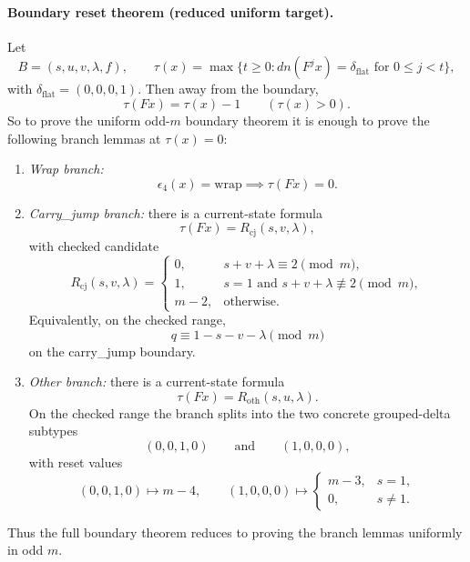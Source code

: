 
\paragraph{Boundary reset theorem (reduced uniform target).}
Let
\[
B=(s,u,v,\lambda,f),\qquad \tau(x)=\max\{t\ge 0: dn(F^j x)=\delta_{\mathrm{flat}}\text{ for }0\le j<t\},
\]
with \(\delta_{\mathrm{flat}}=(0,0,0,1)\). Then away from the boundary,
\[
\tau(Fx)=\tau(x)-1\qquad (\tau(x)>0).
\]
So to prove the uniform odd-\(m\) boundary theorem it is enough to prove the following branch lemmas at \(\tau(x)=0\):
\begin{enumerate}
\item \emph{Wrap branch:}
\[
\epsilon_4(x)=\mathrm{wrap}\implies \tau(Fx)=0.
\]
\item \emph{Carry\_jump branch:} there is a current-state formula
\[
\tau(Fx)=R_{\mathrm{cj}}(s,v,\lambda),
\]
with checked candidate
\[
R_{\mathrm{cj}}(s,v,\lambda)=
\begin{cases}
0,& s+v+\lambda\equiv 2\pmod m,\\
1,& s=1 \text{ and } s+v+\lambda\not\equiv 2\pmod m,\\
m-2,& \text{otherwise}.
\end{cases}
\]
Equivalently, on the checked range,
\[
q\equiv 1-s-v-\lambda\pmod m
\]
on the carry\_jump boundary.
\item \emph{Other branch:} there is a current-state formula
\[
\tau(Fx)=R_{\mathrm{oth}}(s,u,\lambda).
\]
On the checked range the branch splits into the two concrete grouped-delta subtypes
\[
(0,0,1,0)\qquad\text{and}\qquad(1,0,0,0),
\]
with reset values
\[
(0,0,1,0)\mapsto m-4,
\qquad
(1,0,0,0)\mapsto
\begin{cases}
m-3,& s=1,\\
0,& s\neq 1.
\end{cases}
\]
\end{enumerate}
Thus the full boundary theorem reduces to proving the branch lemmas uniformly in odd \(m\).
